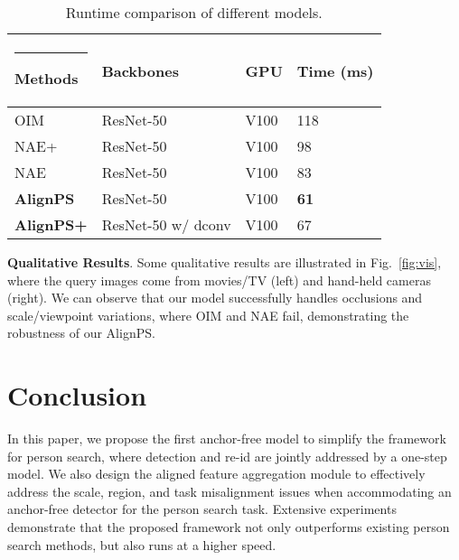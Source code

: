 \documentclass[final]{cvpr}
\makeatletter
\newcommand{\thickhline}{\noalign {\ifnum 0=`}\fi \hrule height 1pt
    \futurelet \reserved@a \@xhline
}
\makeatother
\begin{document}
\begin{table}[t]
\setlength{\abovecaptionskip}{1mm}
\centering
\begin{tabular}{p{1.8cm}p{3cm}p{0.6cm}p{1.3cm}<{\centering}}
\hline\thickhline
\rowcolor{mygray} 
Methods &Backbones & GPU  &  Time (ms)  \\  \hline \hline     
OIM \cite{DBLP:conf/cvpr/XiaoLWLW17} & ResNet-50 & V100 & 118 \\
NAE+ \cite{DBLP:conf/cvpr/ChenZYS20} & ResNet-50 & V100 & 98 \\
NAE \cite{DBLP:conf/cvpr/ChenZYS20} & ResNet-50 & V100 & 83 \\
\textbf{AlignPS} & ResNet-50 & V100 & \textbf{61} \\
\textbf{AlignPS+} & ResNet-50 w/ dconv & V100 & 67
\\\hline
\end{tabular}
\caption{Runtime comparison of different models.}
\label{tab:runtime}
\vspace{-4mm}
\end{table}

\textbf{Qualitative Results}.
Some qualitative results are illustrated in Fig.~\ref{fig:vis}, where the query images come from movies/TV (left) and hand-held cameras (right). We can observe that our model successfully handles occlusions and scale/viewpoint variations, where OIM \cite{DBLP:conf/cvpr/XiaoLWLW17} and NAE \cite{DBLP:conf/cvpr/ChenZYS20} fail, demonstrating the robustness of our AlignPS.


\section{Conclusion}
In this paper, we propose the first anchor-free model to simplify the framework for person search, where detection and re-id are jointly addressed by a one-step model. We also design the aligned feature aggregation module to effectively address the scale, region, and task misalignment issues when accommodating an anchor-free detector for the person search task. Extensive experiments demonstrate that the proposed framework not only outperforms existing person search methods, but also runs at a higher speed.



{\small


}
\end{document}
